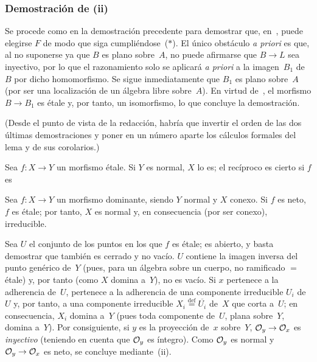 \subsubsection*{Demostración de \textup{(ii)}}
Se
procede como en la demostración precedente para demostrar que, en~, puede elegirse $F$ de modo que siga cumpliéndose~($*$). El único obstáculo \emph{a priori} es que, al no suponerse ya que $B$ es plano sobre~$A$, no puede afirmarse que $B\to L$ sea inyectivo, por lo que el razonamiento solo se aplicará \emph{a priori} a la imagen~$B_1$ de~$B$ por dicho homomorfismo. Se sigue inmediatamente que $B_1$ es plano sobre~$A$ (por ser una localización de un álgebra libre sobre~$A$). En virtud de~, el morfismo $B\to B_1$ es étale y, por tanto, un isomorfismo, lo que concluye la demostración.

(Desde el punto de vista de la redacción, habría que invertir el orden de las dos últimas demostraciones y poner en un número aparte los cálculos formales del lema y de sus corolarios.)

\begin{corollaire}
\label{I.9.10}
Sea $f\colon X\to Y$ un morfismo étale. Si $Y$ es normal, $X$ lo es; el recíproco es cierto si $f$ es %
\end{corollaire}

\begin{corollaire}
\label{I.9.11}
Sea $f\colon X\to Y$ un morfismo dominante, siendo $Y$ normal y $X$ conexo. Si $f$ es neto, $f$ es étale; por tanto, $X$ es normal y, en consecuencia (por ser conexo), irreducible.
\end{corollaire}

Sea $U$ el conjunto de los puntos en los que $f$ es étale; es abierto, y basta demostrar que también es cerrado y no vacío. $U$ contiene la imagen inversa del punto genérico de~$Y$ (pues, para un álgebra sobre un cuerpo, no ramificado $=$ étale) y, por tanto (como $X$ domina a~$Y$), no es vacío. Si $x$ pertenece a la adherencia de~$U$, pertenece a la adherencia de una componente irreducible $U_i$ de~$U$ y, por tanto, a una componente irreducible $X_i\overset{\mathrm{def}}{=}\overline{U_i}$ de~$X$ que corta a~$U$; en consecuencia, $X_i$ domina a~$Y$ (pues toda componente de~$U$, plana sobre~$Y$, domina a~$Y$). Por consiguiente, si $y$ es la proyección de~$x$ sobre~$Y$, $\cal{O}_y\to\cal{O}_x$ es \emph{inyectivo} (teniendo en cuenta que $\cal{O}_y$ es íntegro). Como $\cal{O}_y$ es normal y $\cal{O}_y\to\cal{O}_x$ es neto, se concluye mediante~(ii).


